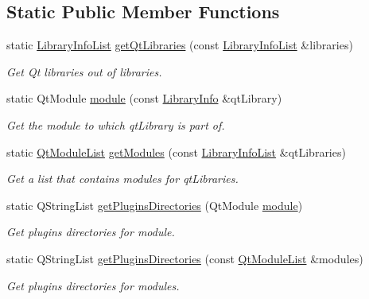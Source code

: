 \subsection*{Static Public Member Functions}
\begin{DoxyCompactItemize}
\item 
static \hyperlink{class_mdt_1_1_deploy_utils_1_1_library_info_list}{Library\+Info\+List} \hyperlink{class_mdt_1_1_deploy_utils_1_1_qt_library_a0c576f08e6aa61164cd9d5c8faad475c}{get\+Qt\+Libraries} (const \hyperlink{class_mdt_1_1_deploy_utils_1_1_library_info_list}{Library\+Info\+List} \&libraries)
\begin{DoxyCompactList}\small\item\em Get Qt libraries out of {\itshape libraries}. \end{DoxyCompactList}\item 
static Qt\+Module \hyperlink{class_mdt_1_1_deploy_utils_1_1_qt_library_aa54f542e548bcab6da5e8a9696169a94}{module} (const \hyperlink{class_mdt_1_1_deploy_utils_1_1_library_info}{Library\+Info} \&qt\+Library)
\begin{DoxyCompactList}\small\item\em Get the module to which {\itshape qt\+Library} is part of. \end{DoxyCompactList}\item 
static \hyperlink{class_mdt_1_1_deploy_utils_1_1_qt_module_list}{Qt\+Module\+List} \hyperlink{class_mdt_1_1_deploy_utils_1_1_qt_library_ac7fd0c6a555df4f4ca7361e36f1a4ae4}{get\+Modules} (const \hyperlink{class_mdt_1_1_deploy_utils_1_1_library_info_list}{Library\+Info\+List} \&qt\+Libraries)
\begin{DoxyCompactList}\small\item\em Get a list that contains modules for {\itshape qt\+Libraries}. \end{DoxyCompactList}\item 
static Q\+String\+List \hyperlink{class_mdt_1_1_deploy_utils_1_1_qt_library_a50c96c2d0b892da7c41d50ca627191bd}{get\+Plugins\+Directories} (Qt\+Module \hyperlink{class_mdt_1_1_deploy_utils_1_1_qt_library_aa54f542e548bcab6da5e8a9696169a94}{module})
\begin{DoxyCompactList}\small\item\em Get plugins directories for {\itshape module}. \end{DoxyCompactList}\item 
static Q\+String\+List \hyperlink{class_mdt_1_1_deploy_utils_1_1_qt_library_ab555321caadc47fcb9458ba466287702}{get\+Plugins\+Directories} (const \hyperlink{class_mdt_1_1_deploy_utils_1_1_qt_module_list}{Qt\+Module\+List} \&modules)
\begin{DoxyCompactList}\small\item\em Get plugins directories for {\itshape modules}. \end{DoxyCompactList}\end{DoxyCompactItemize}


